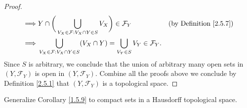 \begin{proof}
\begin{align*}
        \implies & Y \cap \bigg(\bigcup_{V_X \in \mathcal{F} : V_X \cap Y \in S} V_X\bigg) \in \mathcal{F}_Y                  & \text{(by Definition \ref{2.5.7})} \\
        \implies & \bigcup_{V_X \in \mathcal{F} : V_X \cap Y \in S} (V_X \cap Y) = \bigcup_{V_Y \in S} V_Y \in \mathcal{F}_Y.
    \end{align*}
    Since \(S\) is arbitrary, we conclude that the union of arbitrary many open sets in \((Y, \mathcal{F}_Y)\) is open in \((Y, \mathcal{F}_Y)\).
    Combine all the proofs above we conclude by Definition \ref{2.5.1} that \((Y, \mathcal{F}_Y)\) is a topological space.
\end{proof}

\begin{exercise}\label{ex 2.5.13}
    Generalize Corollary \ref{1.5.9} to compact sets in a Hausdorff topological space.
\end{exercise}

